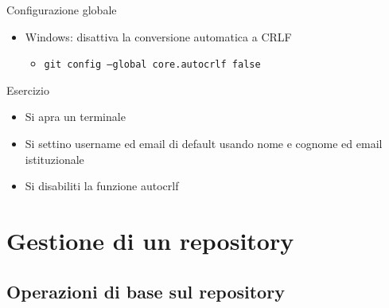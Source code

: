 \documentclass[xcolor=dvipsnames,presentation]{beamer}
\begin{document}
\begin{frame}[allowframebreaks]{Configurazione globale}
{\begin{itemize}
            \begin{itemize}
                \item \texttt{git config --global core.autocrlf input}
            \end{itemize}
            \item Windows: disattiva la conversione automatica a CRLF
            \begin{itemize}
                \item \texttt{git config --global core.autocrlf false}
            \end{itemize}
        \end{itemize}
    }
    \begin{block}{Esercizio}
        \begin{itemize}
            \item Si apra un terminale
            \item Si settino username ed email di default usando nome e cognome ed email istituzionale
            \item Si disabiliti la funzione autocrlf
        \end{itemize}
    \end{block}
\end{frame}

\section{Gestione di un repository}

\subsection{Operazioni di base sul repository}
\end{document}
